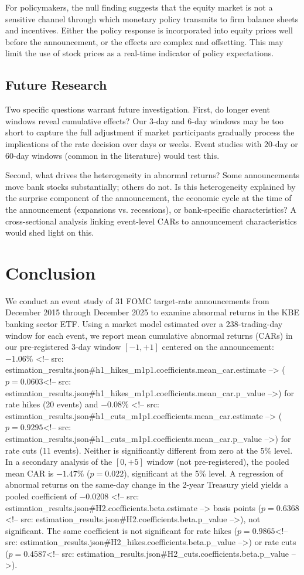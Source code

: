 \documentclass[11pt]{article}
\begin{document}
For policymakers, the null finding suggests that the equity market is not a sensitive channel through which monetary policy transmits to firm balance sheets and incentives. Either the policy response is incorporated into equity prices well before the announcement, or the effects are complex and offsetting. This may limit the use of stock prices as a real-time indicator of policy expectations.

\subsection{Future Research}

Two specific questions warrant future investigation. First, do longer event windows reveal cumulative effects? Our 3-day and 6-day windows may be too short to capture the full adjustment if market participants gradually process the implications of the rate decision over days or weeks. Event studies with 20-day or 60-day windows (common in the literature) would test this.

Second, what drives the heterogeneity in abnormal returns? Some announcements move bank stocks substantially; others do not. Is this heterogeneity explained by the surprise component of the announcement, the economic cycle at the time of the announcement (expansions vs. recessions), or bank-specific characteristics? A cross-sectional analysis linking event-level CARs to announcement characteristics would shed light on this.

\section{Conclusion}

We conduct an event study of 31 FOMC target-rate announcements from December 2015 through December 2025 to examine abnormal returns in the KBE banking sector ETF. Using a market model estimated over a 238-trading-day window for each event, we report mean cumulative abnormal returns (CARs) in our pre-registered 3-day window $[-1, +1]$ centered on the announcement: $-1.06\%$ <!-- src: estimation_results.json#h1_hikes_m1p1.coefficients.mean_car.estimate --> ($p = 0.0603$<!-- src: estimation_results.json#h1_hikes_m1p1.coefficients.mean_car.p_value -->) for rate hikes (20 events) and $-0.08\%$ <!-- src: estimation_results.json#h1_cuts_m1p1.coefficients.mean_car.estimate --> ($p = 0.9295$<!-- src: estimation_results.json#h1_cuts_m1p1.coefficients.mean_car.p_value -->) for rate cuts (11 events). Neither is significantly different from zero at the 5\% level. In a secondary analysis of the $[0, +5]$ window (not pre-registered), the pooled mean CAR is $-1.47\%$ ($p = 0.022$), significant at the 5\% level. A regression of abnormal returns on the same-day change in the 2-year Treasury yield yields a pooled coefficient of $-0.0208$ <!-- src: estimation_results.json#H2.coefficients.beta.estimate --> basis points ($p = 0.6368$<!-- src: estimation_results.json#H2.coefficients.beta.p_value -->), not significant. The same coefficient is not significant for rate hikes ($p = 0.9865$<!-- src: estimation_results.json#H2_hikes.coefficients.beta.p_value -->) or rate cuts ($p = 0.4587$<!-- src: estimation_results.json#H2_cuts.coefficients.beta.p_value -->).
\end{document}
